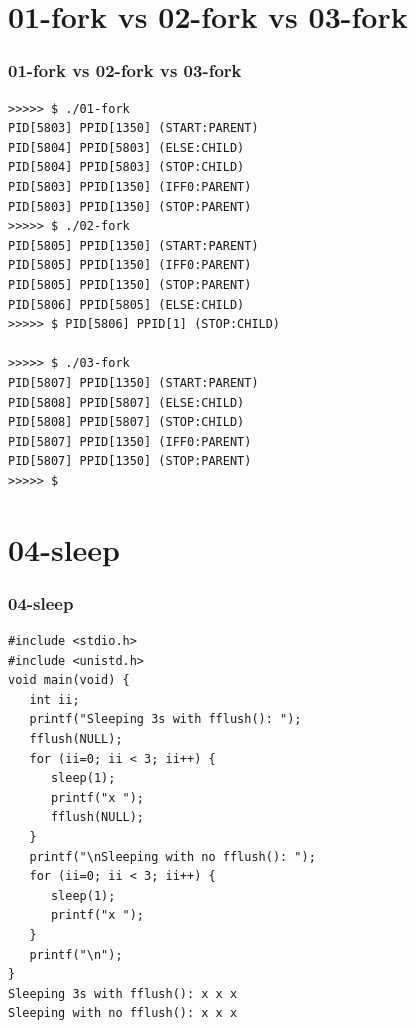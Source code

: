 \documentclass[xcolor=table, notheorems, hyperref={pdfpagelabels=false}]{beamer}
\begin{document}
\section{01-fork vs 02-fork vs 03-fork}
\begin{frame}[fragile]
\frametitle{01-fork vs 02-fork vs 03-fork}
\begin{lstlisting}[basicstyle=\ttfamily\footnotesize]
>>>>> $ ./01-fork 
PID[5803] PPID[1350] (START:PARENT)
PID[5804] PPID[5803] (ELSE:CHILD)
PID[5804] PPID[5803] (STOP:CHILD)
PID[5803] PPID[1350] (IFF0:PARENT)
PID[5803] PPID[1350] (STOP:PARENT)
>>>>> $ ./02-fork 
PID[5805] PPID[1350] (START:PARENT)
PID[5805] PPID[1350] (IFF0:PARENT)
PID[5805] PPID[1350] (STOP:PARENT)
PID[5806] PPID[5805] (ELSE:CHILD)
>>>>> $ PID[5806] PPID[1] (STOP:CHILD)

>>>>> $ ./03-fork 
PID[5807] PPID[1350] (START:PARENT)
PID[5808] PPID[5807] (ELSE:CHILD)
PID[5808] PPID[5807] (STOP:CHILD)
PID[5807] PPID[1350] (IFF0:PARENT)
PID[5807] PPID[1350] (STOP:PARENT)
>>>>> $ 
\end{lstlisting}
\end{frame}

\section{04-sleep}
\begin{frame}[fragile]
\frametitle{04-sleep}
\begin{lstlisting}[basicstyle=\ttfamily\footnotesize]
#include <stdio.h>
#include <unistd.h>
void main(void) {
   int ii;
   printf("Sleeping 3s with fflush(): ");
   fflush(NULL);
   for (ii=0; ii < 3; ii++) {
      sleep(1);
      printf("x ");
      fflush(NULL);
   }
   printf("\nSleeping with no fflush(): ");
   for (ii=0; ii < 3; ii++) {
      sleep(1);
      printf("x ");
   }
   printf("\n");
}
Sleeping 3s with fflush(): x x x 
Sleeping with no fflush(): x x x 
\end{lstlisting}
\end{frame}
\end{document}
